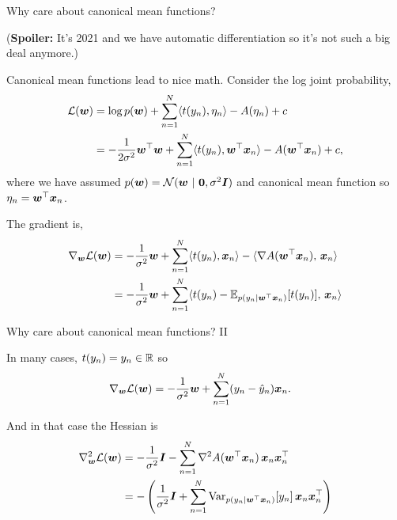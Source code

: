 \documentclass[aspectratio=169]{beamer}
\begin{document}
\begin{frame}{Why care about canonical mean functions?}

(\textbf{Spoiler:} It's 2021 and we have automatic differentiation so it's not such a big deal anymore.)

Canonical mean functions lead to nice math. Consider the log joint probability,
\begin{align}
    \mathcal{L}(\boldsymbol{w}) &= \log p(\boldsymbol{w}) + \sum_{n=1}^N \langle t(y_n), \eta_n \rangle - A(\eta_n)  + c \\
    &= -\frac{1}{2\sigma^2} \boldsymbol{w}^\top \boldsymbol{w} + \sum_{n=1}^N \langle t(y_n), \boldsymbol{w}^\top \boldsymbol{x}_n \rangle - A(\boldsymbol{w}^\top \boldsymbol{x}_n) + c,
\end{align}
where we have assumed $p(\boldsymbol{w}) = \mathcal{N}(\boldsymbol{w} ~\vert~ \boldsymbol{0}, \sigma^2 \boldsymbol{I})$ and canonical mean function so $\eta_n = \boldsymbol{w}^\top \boldsymbol{x}_n$.

The gradient is,
\begin{align}
    \nabla_{\boldsymbol{w}} \mathcal{L}(\boldsymbol{w}) 
    &= -\frac{1}{\sigma^2}\boldsymbol{w} + \sum_{n=1}^N \langle t(y_n), \boldsymbol{x}_n \rangle - \langle \nabla A(\boldsymbol{w}^\top \boldsymbol{x}_n), \, \boldsymbol{x}_n \rangle\\
    &= -\frac{1}{\sigma^2}\boldsymbol{w} + \sum_{n=1}^N \langle t(y_n) - \mathbb{E}_{p(y_n | \boldsymbol{w}^\top \boldsymbol{x}_n)}[t(y_n)], \, \boldsymbol{x}_n \rangle
\end{align}

\end{frame}

\begin{frame}{Why care about canonical mean functions? II}

In many cases, $t(y_n) = y_n \in \mathbb{R}$ so
\begin{align}
    \nabla_{\boldsymbol{w}} \mathcal{L}(\boldsymbol{w}) 
    &= -\frac{1}{\sigma^2}\boldsymbol{w} + \sum_{n=1}^N (y_n - \hat{y}_n) \boldsymbol{x}_n.
\end{align}

And in that case the Hessian is
\begin{align}
    \nabla^2_{\boldsymbol{w}} \mathcal{L}(\boldsymbol{w}) 
    &= -\frac{1}{\sigma^2}\boldsymbol{I} - \sum_{n=1}^N \nabla^2 A(\boldsymbol{w}^\top \boldsymbol{x}_n) \, \boldsymbol{x}_n \boldsymbol{x}_n^\top \\
    &= -\left( \frac{1}{\sigma^2}\boldsymbol{I} + \sum_{n=1}^N \mathrm{Var}_{p(y_n | \boldsymbol{w}^\top \boldsymbol{x}_n)}[y_n] \, \boldsymbol{x}_n \boldsymbol{x}_n^\top \right)
\end{align}

\end{frame}
\end{document}
